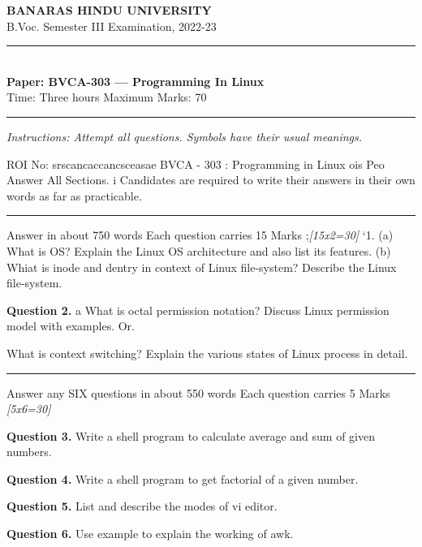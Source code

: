 \documentclass[11pt,a4paper]{article}
\newcommand{\pts}[1]{\hfill\textit{[#1]}}
\begin{document}
\begin{center}
  {\large\bfseries BANARAS HINDU UNIVERSITY}\\[2pt]
  {\normalsize B.Voc. Semester III Examination, 2022-23}\\[6pt]
  \rule{0.8\linewidth}{0.5pt}\\[6pt]
  {\large\bfseries Paper: BVCA-303 --- Programming In Linux}\\[4pt]
  {\normalsize Time: Three hours \hfill Maximum Marks: 70}
\end{center}

\rule{\linewidth}{0.4pt}

\smallskip
\noindent\textit{Instructions: Attempt all questions. Symbols have their usual meanings.}

\bigskip

ROI No: srscancaccancsceasae
BVCA - 303 : Programming in Linux
ois Peo Answer All Sections.
i Candidates are required to write their answers in their own words as far as practicable.

\bigskip{}
\rule{\linewidth}{0.4pt}\smallskip

Answer in about 750 words
Each question carries 15 Marks
;\pts{15x2=30}
‘1. (a) What is OS? Explain the Linux OS architecture and also list its features.
 (b) Whiat is inode and dentry in context of Linux file-system? Describe the Linux file-system.

\medskip\noindent\textbf{Question 2.} {a} What is octal permission notation? Discuss Linux permission model with examples.
Or.
\begin{parts}
  \item What is context switching? Explain the various states of Linux process in detail.
\end{parts}

\bigskip{}
\rule{\linewidth}{0.4pt}\smallskip

Answer any SIX questions in about 550 words
Each question carries 5 Marks
\pts{5x6=30}

\medskip\noindent\textbf{Question 3.} Write a shell program to calculate average and sum of given numbers.

\medskip\noindent\textbf{Question 4.} Write a shell program to get factorial of a given number.

\medskip\noindent\textbf{Question 5.} List and describe the modes of vi editor.

\medskip\noindent\textbf{Question 6.} Use example to explain the working of awk.
\end{document}
